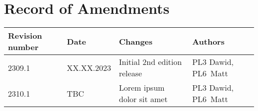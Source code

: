 \clearpage
\section*{Record of Amendments}
{
    \begin{tabular}{p{1.5cm} p{2cm} p{6.5cm} l}
    \toprule
    \textbf{Revision number} & \textbf{Date} & \textbf{Changes} & \textbf{Authors}\\\midrule
    2309.1 & XX.XX.2023 & Initial 2nd edition release & PL3 Dawid, PL6~Matt\\
    2310.1 & TBC & Lorem ipsum dolor sit amet & PL3 Dawid, PL6~Matt\\
    \bottomrule
    \end{tabular}
}